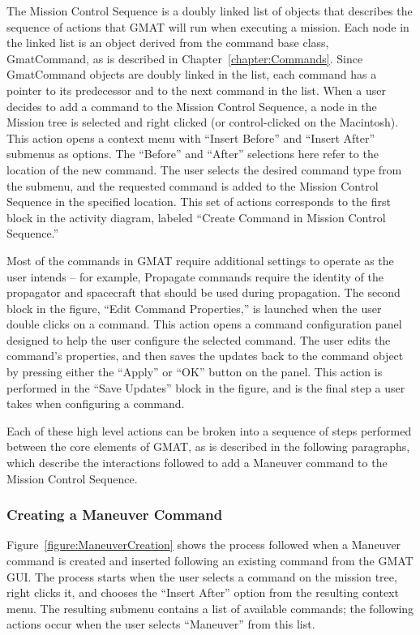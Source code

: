 The Mission Control Sequence is a doubly linked list of objects that describes the sequence of
actions that GMAT will run when executing a mission.  Each node in the linked list is an object
derived from the command base class, GmatCommand, as is described in Chapter~\ref{chapter:Commands}.
 Since GmatCommand objects are doubly linked in the list, each command has a pointer to its
predecessor and to the next command in the list.  When a user decides to add a command to the
Mission Control Sequence, a node in the Mission tree is selected and right clicked (or
control-clicked on the Macintosh).  This action opens a context menu with ``Insert Before'' and
``Insert After'' submenus as options.  The ``Before'' and ``After'' selections here refer to the
location of the new command.  The user selects the desired command type from the submenu, and the
requested command is added to the Mission Control Sequence in the specified location.  This set of
actions corresponds to the first block in the activity diagram, labeled ``Create Command in Mission
Control Sequence.''

Most of the commands in GMAT require additional settings to operate as the user intends -- for
example, Propagate commands require the identity of the propagator and spacecraft that should be
used during propagation.  The second block in the figure, ``Edit Command Properties,'' is launched
when the user double clicks on a command.  This action opens a command configuration panel designed
to help the user configure the selected command.  The user edits the command's properties, and then
saves the updates back to the command object by pressing either the ``Apply'' or ``OK'' button on
the panel.  This action is performed in the ``Save Updates'' block in the figure, and is the final
step a user takes when configuring a command.

Each of these high level actions can be broken into a sequence of steps performed between the core
elements of GMAT, as is described in the following paragraphs, which describe the interactions
followed to add a Maneuver command to the Mission Control Sequence.

\subsubsection{\label{section:CommandCreation}Creating a Maneuver Command}

Figure~\ref{figure:ManeuverCreation} shows the process followed when a Maneuver command is created
and inserted following an existing command from the GMAT GUI.  The process starts when the user
selects a command on the mission tree, right clicks it, and chooses the ``Insert After'' option
from the resulting context menu.  The resulting submenu contains a list of available commands; the
following actions occur when the user selects ``Maneuver'' from this list.

